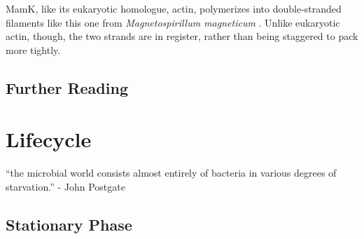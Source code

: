 \documentclass[]{tufte-book}
\begin{document}
MamK, like its eukaryotic homologue, actin, polymerizes into
double-stranded filaments like this one from \emph{Magnetospirillum
magneticum} \citet{bergeron2017}. Unlike eukaryotic actin, though, the
two strands are in register, rather than being staggered to pack more
tightly.

\section{Further Reading}\label{further-reading-6}

\citet{berg1988} \citet{hazelbauer2008} \citet{lower2013}
\citet{schuergers2016}

\chapter{Lifecycle}\label{lifecycle}

``the microbial world consists almost entirely of bacteria in various
degrees of starvation.'' - John Postgate \citet{postgate1994}

\section{Stationary Phase}\label{stationary-phase}
\end{document}
